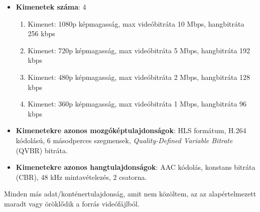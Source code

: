 \begin{itemize}
  \setlength{\itemsep}{1pt}
  \setlength{\parskip}{0pt}
  \setlength{\parsep}{0pt}
  \item \textbf{Kimenetek száma}: 4
        \begin{enumerate}
          \setlength{\itemsep}{1pt}
          \setlength{\parskip}{0pt}
          \setlength{\parsep}{0pt}
          \item Kimenet: 1080p képmagasság, max videóbitráta 10 Mbps, hangbitráta 256 kbps
          \item Kimenet: 720p képmagasság, max videóbitráta 5 Mbps, hangbitráta 192 kbps
          \item Kimenet: 480p képmagasság, max videóbitráta 2 Mbps, hangbitráta 128 kbps
          \item Kimenet: 360p képmagasság, max videóbitráta 1 Mbps, hangbitráta 96 kbps
        \end{enumerate}
  \item \textbf{Kimenetekre azonos mozgóképtulajdonságok}: HLS formátum, H.264 kódolású, 6 másodperces szegmensek, \emph{Quality-Defined Variable Bitrate} (QVBR) bitráta\cite{qvbr}.
  \item \textbf{Kimenetekre azonos hangtulajdonságok}: AAC kódolás, konstans bitráta (CBR), 48 kHz mintavételezés, 2 csatorna.
\end{itemize}

Minden más adat/konténertulajdonság, amit nem közöltem, az az alapértelmezett maradt vagy öröklődik a forrás videófájlból.

